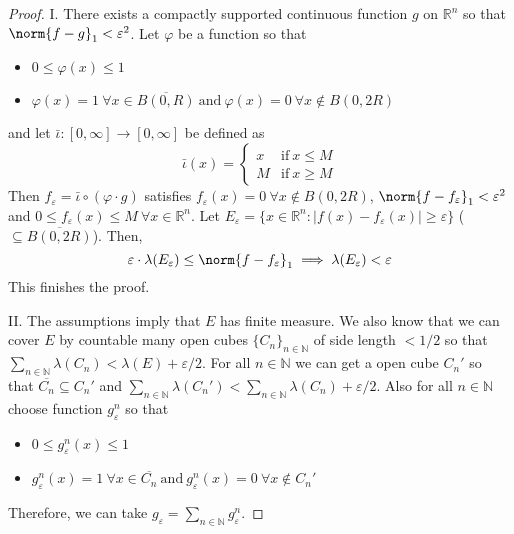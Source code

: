 \documentclass[11pt]{article}
\theoremstyle{definition}
\theoremstyle{proof}
\begin{document}
\begin{proof}
    I\@. There exists a compactly supported continuous function $g$ on $\mathbb{R}^{n}$ so that $\norm{f - g}_1 < \varepsilon ^2$.
    Let $\varphi$ be a function so that
    \begin{itemize}[]
        \item $0 \leq \varphi (x) \leq 1$
        \item $\varphi (x) = 1 \ \forall x \in \overline{B(0, R)} \ \text{and} \ \varphi (x) = 0 \ \forall x \notin B(0, 2R)$
    \end{itemize}
    and let $\bar{\iota } : [0, \infty] \to [0, \infty]$ be defined as
    \[
        \bar{\iota } (x) =
        \begin{cases}
            x & \text{if} \ x \leq M \\
            M & \text{if} \ x \geq M
        \end{cases}
    \]
    Then $f_ \varepsilon = \bar{\iota } \circ (\varphi \cdot g)$ satisfies $f_ \varepsilon (x) = 0 \ \forall x \notin B(0, 2R)$, $\norm{f-f_ \varepsilon }_1 < \varepsilon ^2$ and $0 \leq f_ \varepsilon (x) \leq M \ \forall x \in \mathbb{R}^{n}$.
    Let $E_ \varepsilon = \{x \in \mathbb{R}^{n} : |f(x) - f_ \varepsilon (x)| \geq \varepsilon \}$ \big($\subseteq \overline{B(0, 2R)}$\big).
    Then,
    \[
        \varepsilon \cdot \lambda (E_ \varepsilon ) \leq \norm{f - f_ \varepsilon }_1 \implies \lambda (E_ \varepsilon ) < \varepsilon 
    \]
    This finishes the proof.

    II\@. The assumptions imply that $E$ has finite measure.
    We also know that we can cover $E$ by countable many open cubes $\{C_n\}_{n \in \mathbb{N}}$ of side length $< 1/2$ so that $\sum\limits_{n \in \mathbb{N}} \lambda (C_n) < \lambda (E) + \varepsilon /2$.
    For all $n \in \mathbb{N}$ we can get a open cube $C_n '$ so that $\overline{C_n} \subseteq C_n '$ and $\sum\limits_{n \in \mathbb{N}} \lambda (C_n ') < \sum\limits_{n \in \mathbb{N}} \lambda (C_n) + \varepsilon /2$.
    Also for all $n \in \mathbb{N}$ choose function $g_ \varepsilon ^n$ so that
    \begin{itemize}[]
        \item $0 \leq g_ \varepsilon ^n(x) \leq 1$
        \item $g_ \varepsilon ^n(x) = 1 \ \forall x \in \overline{C_n} \ \text{and} \ g_ \varepsilon ^n(x) = 0 \ \forall x \notin C_n '$
    \end{itemize}
    Therefore, we can take $g_ \varepsilon = \sum\limits_{n \in \mathbb{N}} g_ \varepsilon ^n$.
\end{proof}
\end{document}
